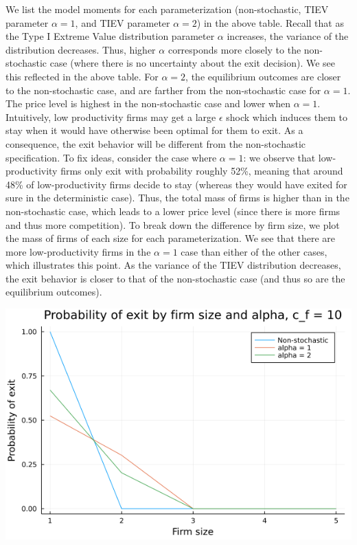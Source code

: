 \documentclass[12pt]{article}
\begin{document}
We list the model moments for each parameterization (non-stochastic, TIEV parameter $\alpha = 1$, and TIEV parameter $\alpha = 2$) in the above table. Recall that as the Type I Extreme Value distribution parameter $\alpha$ increases, the variance of the distribution decreases. Thus, higher $\alpha$ corresponds more closely to the non-stochastic case (where there is no uncertainty about the exit decision). We see this reflected in the above table. For $\alpha = 2$, the equilibrium outcomes are closer to the non-stochastic case, and are farther from the non-stochastic case for $\alpha = 1$. The price level is highest in the non-stochastic case and lower when $\alpha = 1$. Intuitively, low productivity firms may get a large $\epsilon$ shock which induces them to stay when it would have otherwise been optimal for them to exit. As a consequence, the exit behavior will be different from the non-stochastic specification. To fix ideas, consider the case where $\alpha = 1$: we observe that low-productivity firms only exit with probability roughly 52\%, meaning that around 48\% of low-productivity firms decide to stay (whereas they would have exited for sure in the deterministic case). Thus, the total mass of firms is higher than in the non-stochastic case, which leads to a lower price level (since there is more firms and thus more competition). To break down the difference by firm size, we plot the mass of firms of each size for each parameterization. We see that there are more low-productivity firms in the $\alpha = 1$ case than either of the other cases, which illustrates this point. As the variance of the TIEV distribution decreases, the exit behavior is closer to that of the non-stochastic case (and thus so are the equilibrium  outcomes).

\begin{center}
    \includegraphics[scale=0.7]{exitplot10.png}
\end{center}
\end{document}
